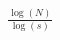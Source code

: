 \documentclass[preview]{standalone}
\begin{document}
\begin{align*}
\frac{\log(N)}{\log(s)}
\end{align*}
\end{document}
